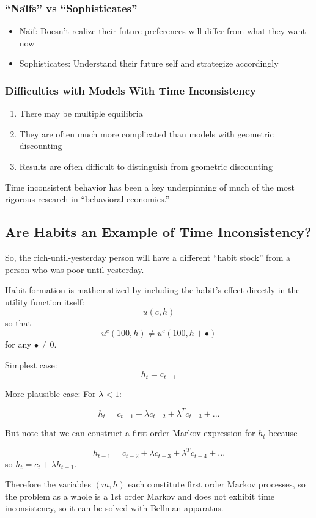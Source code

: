 \documentclass{scrartcl}
\begin{document}
\subsubsection*{``Na\"{\i}fs'' vs ``Sophisticates''}

\begin{itemize}
\item Na\"{\i}f: Doesn't realize their future preferences will differ from what they want now
\item Sophisticates: Understand their future self and strategize accordingly
\end{itemize}

\subsubsection*{Difficulties with Models With Time Inconsistency}
\begin{enumerate}
\item There may be multiple equilibria
\item They are often much more complicated than models with geometric discounting
  \item Results are often difficult to distinguish from geometric discounting
\end{enumerate}

Time inconsistent behavior has been a key underpinning of much of the most rigorous research in \href{https://en.wikipedia.org/wiki/Dynamic_inconsistency#In_behavioral_economics}{``behavioral economics.''}

\label{habits}
\subsection*{Are Habits an Example of Time Inconsistency?}

So, the rich-until-yesterday person will have a different ``habit stock'' from a person who was poor-until-yesterday.

Habit formation is mathematized by including the habit's effect directly in the utility function itself:
\[ u(c,h)
\]
so that 
\[ u^{c}(100,h) \neq u^{c}(100,h+\bullet)
\]
for any $\bullet \neq 0$.

Simplest case:
\[ h_{t} = c_{t-1}
\]

More plausible case: For $\lambda < 1$:

\[ h_{t} = c_{t-1} + \lambda c_{t-2} + \lambda^{T} c_{t-3} + ...
\]

But note that we can construct a first order Markov expression for $h_{t}$ because

\[ h_{t-1} = c_{t-2} + \lambda c_{t-3} + \lambda^{T} c_{t-4} + ...
\]
so $h_{t}=c_{t}+\lambda h_{t-1}$.

Therefore the variables $(m,h)$ each constitute first order Markov processes, so the problem as a whole is a 1st order Markov and does not exhibit time inconsistency, so it can be solved with Bellman apparatus.
\end{document}
